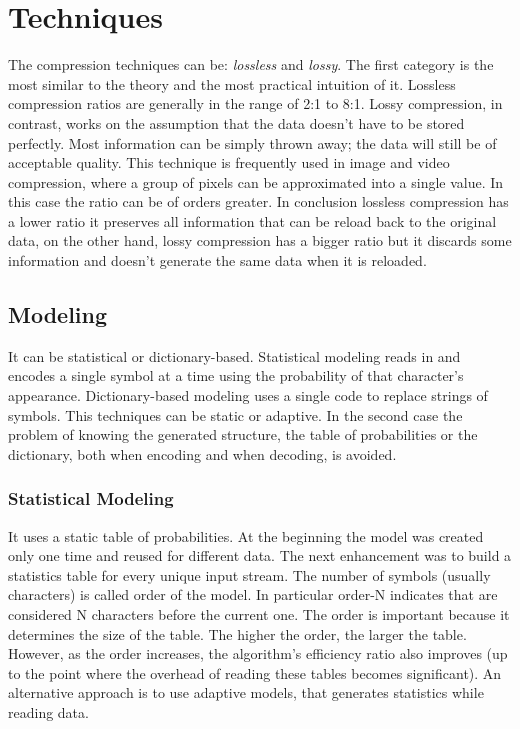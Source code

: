 \documentclass[12pt, a4paper]{report}
\begin{document}
\section{Techniques}

The compression techniques can be: \textit{lossless} and \textit{lossy}.
The first category is the most similar to the theory and the most practical intuition of it.
Lossless compression ratios are generally in the range of 2:1 to 8:1.
Lossy compression, in contrast, works on the assumption that the data doesn't have to be stored perfectly.
Most information can be simply thrown away; the data will still be of acceptable quality.
This technique is frequently used in image and video compression, where a group of pixels can be approximated into a single value.
In this case the ratio can be of orders greater.
In conclusion lossless compression has a lower ratio it preserves all information that can be reload back to the original data, on
the other hand, lossy compression has a bigger ratio but it discards some information and doesn't generate the same data when it
is reloaded.

\subsection{Modeling}

It can be statistical or dictionary-based.
Statistical modeling reads in and encodes a single symbol at a time using the probability of that character's appearance.
Dictionary-based modeling uses a single code to replace strings of symbols.
This techniques can be static or adaptive.
In the second case the problem of knowing the generated structure, the table of probabilities or the dictionary,
both when encoding and when decoding, is avoided.

\subsubsection{Statistical Modeling}

It uses a static table of probabilities.
At the beginning the model was created only one time and reused for different data.
The next enhancement was to build a statistics table for every unique input stream.
The number of symbols (usually characters) is called order of the model.
In particular order-N indicates that are considered N characters before the current one.
The order is important because it determines the size of the table. The higher the order, the larger the table.
However, as the order increases, the algorithm's efficiency ratio also improves (up to the point where the overhead of
reading these tables becomes significant).
An alternative approach is to use adaptive models, that generates statistics while reading data.
\end{document}
